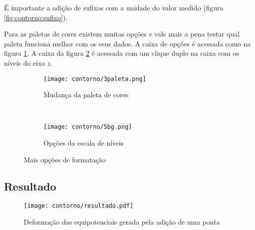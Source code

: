     \begin{lembrete}
        É importante a adição de sufixos com a unidade do valor medido (figura \ref{fig:contorno:sufixo}).
    \end{lembrete}

    Para as paletas de cores existem muitas opções e vale mais a pena testar qual paleta funciona melhor com os seus dados. A caixa de opções é acessada como na figura \ref{fig:contorno:paleta}. A caixa da figura \ref{fig:contorno:escala} é acessada com um clique duplo na caixa com os níveis do eixo $z$.

    \begin{figure}[H]
        \centering
        \begin{subfigure}{0.45\textwidth}
            \centering
            \texttt{[image: contorno/3paleta.png]}

            \caption{Mudança da paleta de cores}
            \label{fig:contorno:paleta}
        \end{subfigure}
        ~
        \begin{subfigure}{0.45\textwidth}
            \centering
            \texttt{[image: contorno/5bg.png]}

            \caption{Opções da escala de níveis}
            \label{fig:contorno:escala}
        \end{subfigure}
        \caption{Mais opções de formatação}
        \label{fig:contorno:extra}
    \end{figure}

\subsection{Resultado}

    \begin{figure}[htbp]
        \centering
        \texttt{[image: contorno/resultado.pdf]}

        \caption{Deformação das equipotenciais gerada pela adição de uma ponta}
        \label{fig:contorno:final}
    \end{figure}

